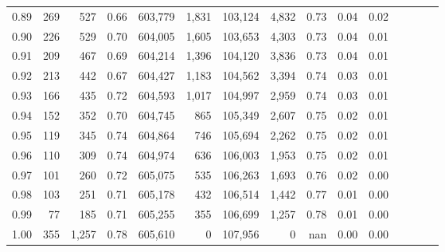 \begin{tabular}{rrrcrrrrrrrrrrr}
0.89 &     269 &    527 &                                       0.66 &  603,779 &    1,831 &  103,124 &    4,832 &  0.73 &  0.04 &                         0.02 \\
0.90 &     226 &    529 &                                       0.70 &  604,005 &    1,605 &  103,653 &    4,303 &  0.73 &  0.04 &                         0.01 \\
0.91 &     209 &    467 &                                       0.69 &  604,214 &    1,396 &  104,120 &    3,836 &  0.73 &  0.04 &                         0.01 \\
0.92 &     213 &    442 &                                       0.67 &  604,427 &    1,183 &  104,562 &    3,394 &  0.74 &  0.03 &                         0.01 \\
0.93 &     166 &    435 &                                       0.72 &  604,593 &    1,017 &  104,997 &    2,959 &  0.74 &  0.03 &                         0.01 \\
0.94 &     152 &    352 &                                       0.70 &  604,745 &      865 &  105,349 &    2,607 &  0.75 &  0.02 &                         0.01 \\
0.95 &     119 &    345 &                                       0.74 &  604,864 &      746 &  105,694 &    2,262 &  0.75 &  0.02 &                         0.01 \\
0.96 &     110 &    309 &                                       0.74 &  604,974 &      636 &  106,003 &    1,953 &  0.75 &  0.02 &                         0.01 \\
0.97 &     101 &    260 &                                       0.72 &  605,075 &      535 &  106,263 &    1,693 &  0.76 &  0.02 &                         0.00 \\
0.98 &     103 &    251 &                                       0.71 &  605,178 &      432 &  106,514 &    1,442 &  0.77 &  0.01 &                         0.00 \\
0.99 &      77 &    185 &                                       0.71 &  605,255 &      355 &  106,699 &    1,257 &  0.78 &  0.01 &                         0.00 \\
1.00 &     355 &  1,257 &                                       0.78 &  605,610 &        0 &  107,956 &        0 &   nan &  0.00 &                         0.00 \\
\bottomrule
\end{tabular}
